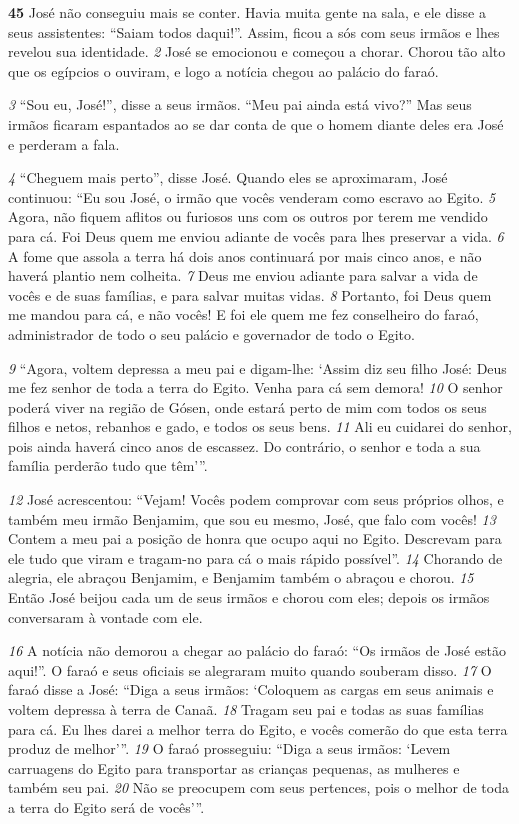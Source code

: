 \bigskip
\textbf{\large 45} José não conseguiu mais se conter. Havia muita gente na sala, e ele disse a
seus assistentes: “Saiam todos daqui!”. Assim, ficou a sós com seus irmãos e lhes
revelou sua identidade. 
\textit{\tiny 2} 
José se emocionou e começou a chorar. Chorou tão alto
que os egípcios o ouviram, e logo a notícia chegou ao palácio do faraó. 

\bigskip
\textit{\tiny 3}
“Sou eu, José!”, disse a seus irmãos. “Meu pai ainda está vivo?” Mas seus irmãos
ficaram espantados ao se dar conta de que o homem diante deles era José e
perderam a fala. 

\bigskip
\textit{\tiny 4} 
“Cheguem mais perto”, disse José. Quando eles se aproximaram,
José continuou: “Eu sou José, o irmão que vocês venderam como escravo ao Egito. 
\textit{\tiny 5} 
Agora, não fiquem aflitos ou furiosos uns com os outros por terem me vendido
para cá. Foi Deus quem me enviou adiante de vocês para lhes preservar a vida. 
\textit{\tiny 6} 
A
fome que assola a terra há dois anos continuará por mais cinco anos, e não haverá
plantio nem colheita. 
\textit{\tiny 7} 
Deus me enviou adiante para salvar a vida de vocês e de
suas famílias, e para salvar muitas vidas. 
\textit{\tiny 8} 
Portanto, foi Deus quem me mandou para cá, e não vocês! E foi ele quem me fez conselheiro
do faraó, administrador
de todo o seu palácio e governador de todo o Egito. 

\bigskip
\textit{\tiny 9}
“Agora, voltem depressa a meu pai e digam-lhe: ‘Assim diz seu filho José: Deus
me fez senhor de toda a terra do Egito. Venha para cá sem demora! 
\textit{\tiny 10}
O senhor
poderá viver na região de Gósen, onde estará perto de mim com todos os seus
filhos e netos, rebanhos e gado, e todos os seus bens. 
\textit{\tiny 11}
Ali eu cuidarei do senhor,
pois ainda haverá cinco anos de escassez. Do contrário, o senhor e toda a sua
família perderão tudo que têm’”.

\bigskip
\textit{\tiny 12}
José acrescentou: “Vejam! Vocês podem comprovar com seus próprios olhos,
e também meu irmão Benjamim, que sou eu mesmo, José, que falo com vocês!
\textit{\tiny 13}
Contem a meu pai a posição de honra que ocupo aqui no Egito. Descrevam para
ele tudo que viram e tragam-no para cá o mais rápido possível”. 
\textit{\tiny 14}
Chorando de
alegria, ele abraçou Benjamim, e Benjamim também o abraçou e chorou. 
\textit{\tiny 15}
Então
José beijou cada um de seus irmãos e chorou com eles; depois os irmãos
conversaram à vontade com ele.

\bigskip
\textit{\tiny 16}
A notícia não demorou a chegar ao palácio do faraó: “Os irmãos de José estão
aqui!”. O faraó e seus oficiais se alegraram muito quando souberam disso.
\textit{\tiny 17}
O faraó disse a José: “Diga a seus irmãos: ‘Coloquem as cargas em seus
animais e voltem depressa à terra de Canaã. 
\textit{\tiny 18}
Tragam seu pai e todas as suas
famílias para cá. Eu lhes darei a melhor terra do Egito, e vocês comerão do que
esta terra produz de melhor’”.
\textit{\tiny 19}
O faraó prosseguiu: “Diga a seus irmãos: ‘Levem carruagens do Egito para
transportar as crianças pequenas, as mulheres e também seu pai. 
\textit{\tiny 20}
Não se
preocupem com seus pertences, pois o melhor de toda a terra do Egito será de
vocês’”.

